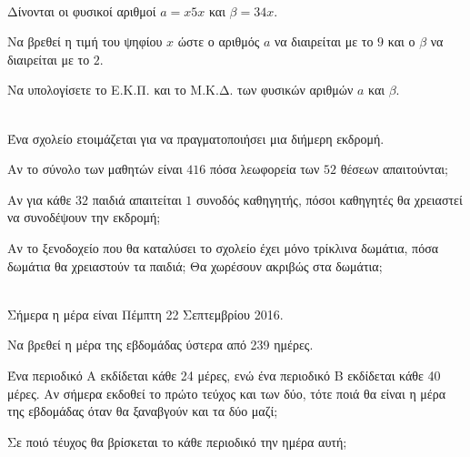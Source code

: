 \documentclass[ektypwsh]{diag-xelatex}
\begin{document}
\askhseis
\begin{thema}
\item \mbox{}\\
Δίνονται οι φυσικοί αριθμοί $ a=x5x $ και $ \beta=34x $.
\begin{erwthma}
\item Να βρεθεί η τιμή του ψηφίου $ x $ ώστε ο αριθμός $ a $ να διαιρείται με το $ 9 $ και ο $ \beta $ να διαιρείται με το $ 2 $.\\
\item Να υπολογίσετε το Ε.Κ.Π. και το Μ.Κ.Δ. των φυσικών αριθμών $ a $ και $ \beta $.
\end{erwthma}
\item \mbox{}\\
Ένα σχολείο ετοιμάζεται για να πραγματοποιήσει μια διήμερη εκδρομή.
\begin{erwthma}
\item Αν το σύνολο των μαθητών είναι $ 416 $ πόσα λεωφορεία των $ 52 $ θέσεων
απαιτούνται; 
\item Αν για κάθε $ 32 $ παιδιά απαιτείται $ 1 $ συνοδός καθηγητής, πόσοι καθηγητές θα χρειαστεί να συνοδέψουν την εκδρομή;
\item Αν το ξενοδοχείο που θα καταλύσει το σχολείο έχει μόνο τρίκλινα δωμάτια, πόσα δωμάτια θα χρειαστούν τα παιδιά; Θα χωρέσουν ακριβώς στα δωμάτια;
\end{erwthma}
\item \mbox{}\\
Σήμερα η μέρα είναι Πέμπτη 22 Σεπτεμβρίου 2016.
\begin{erwthma}
\item Να βρεθεί η μέρα της εβδομάδας ύστερα από 239 ημέρες.
\item Ένα περιοδικό Α εκδίδεται κάθε 24 μέρες, ενώ ένα περιοδικό Β εκδίδεται κάθε 40 μέρες. Αν σήμερα εκδοθεί το πρώτο τεύχος και των δύο, τότε ποιά θα είναι η μέρα της εβδομάδας όταν θα ξαναβγούν και τα δύο μαζί;
\item Σε ποιό τέυχος θα βρίσκεται το κάθε περιοδικό την ημέρα αυτή; 
\end{erwthma}
\end{thema}
\end{document}
